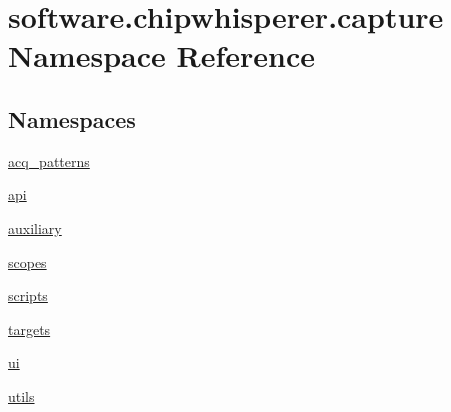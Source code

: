 \hypertarget{namespacesoftware_1_1chipwhisperer_1_1capture}{}\section{software.\+chipwhisperer.\+capture Namespace Reference}
\label{namespacesoftware_1_1chipwhisperer_1_1capture}
\subsection*{Namespaces}
\begin{DoxyCompactItemize}
\item 
 \hyperlink{namespacesoftware_1_1chipwhisperer_1_1capture_1_1acq__patterns}{acq\+\_\+patterns}
\item 
 \hyperlink{namespacesoftware_1_1chipwhisperer_1_1capture_1_1api}{api}
\item 
 \hyperlink{namespacesoftware_1_1chipwhisperer_1_1capture_1_1auxiliary}{auxiliary}
\item 
 \hyperlink{namespacesoftware_1_1chipwhisperer_1_1capture_1_1scopes}{scopes}
\item 
 \hyperlink{namespacesoftware_1_1chipwhisperer_1_1capture_1_1scripts}{scripts}
\item 
 \hyperlink{namespacesoftware_1_1chipwhisperer_1_1capture_1_1targets}{targets}
\item 
 \hyperlink{namespacesoftware_1_1chipwhisperer_1_1capture_1_1ui}{ui}
\item 
 \hyperlink{namespacesoftware_1_1chipwhisperer_1_1capture_1_1utils}{utils}
\end{DoxyCompactItemize}

